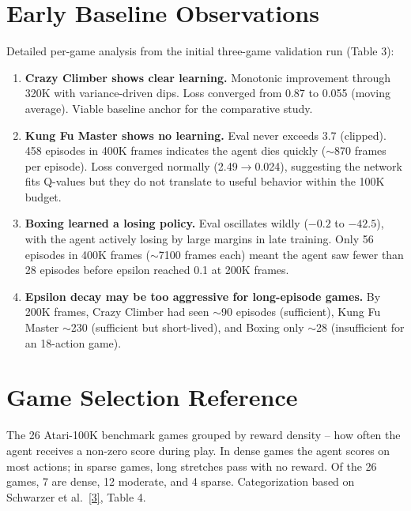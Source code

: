 \documentclass[11pt]{article}
\newcommand{\citelink}[2]{\href{#1}{\small[#2]}}
\begin{document}
\section{Early Baseline Observations}
\label{app:observations}

Detailed per-game analysis from the initial three-game validation run
(Table 3):

\begin{enumerate}[nosep]
  \item \textbf{Crazy Climber shows clear learning.} Monotonic
    improvement through 320K with variance-driven dips. Loss converged
    from 0.87 to 0.055 (moving average). Viable baseline anchor for the
    comparative study.

  \item \textbf{Kung Fu Master shows no learning.} Eval never exceeds
    3.7 (clipped). 458 episodes in 400K frames indicates the agent
    dies quickly ($\sim$870 frames per episode). Loss converged normally
    (2.49$\to$0.024), suggesting the network fits Q-values but they do
    not translate to useful behavior within the 100K budget.

  \item \textbf{Boxing learned a losing policy.} Eval oscillates
    wildly ($-0.2$ to $-42.5$), with the agent actively losing by large
    margins in late training. Only 56 episodes in 400K frames
    ($\sim$7100 frames each) meant the agent saw fewer than 28 episodes
    before epsilon reached 0.1 at 200K frames.

  \item \textbf{Epsilon decay may be too aggressive for long-episode
    games.} By 200K frames, Crazy Climber had seen $\sim$90 episodes
    (sufficient), Kung Fu Master $\sim$230 (sufficient but short-lived),
    and Boxing only $\sim$28 (insufficient for an 18-action game).
\end{enumerate}

\section{Game Selection Reference}
\label{app:games}

The 26 Atari-100K benchmark games grouped by reward density -- how
often the agent receives a non-zero score during play. In dense games
the agent scores on most actions; in sparse games, long stretches pass
with no reward. Of the 26 games, 7 are dense, 12 moderate, and
4 sparse. Categorization based on Schwarzer et al.\
\citelink{https://arxiv.org/abs/2007.05929}{3}, Table 4.
\end{document}
